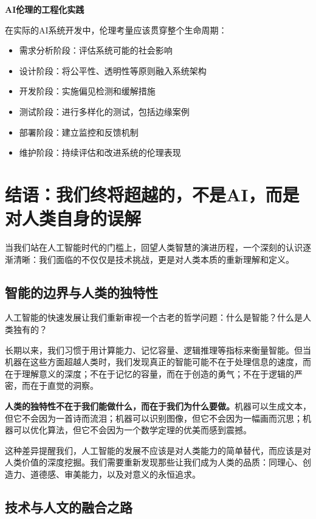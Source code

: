 \begin{methodbox}
{\bf AI伦理的工程化实践}

在实际的AI系统开发中，伦理考量应该贯穿整个生命周期：
\begin{itemize}
\item 需求分析阶段：评估系统可能的社会影响
\item 设计阶段：将公平性、透明性等原则融入系统架构
\item 开发阶段：实施偏见检测和缓解措施
\item 测试阶段：进行多样化的测试，包括边缘案例
\item 部署阶段：建立监控和反馈机制
\item 维护阶段：持续评估和改进系统的伦理表现
\end{itemize}
\end{methodbox}

\section*{结语：我们终将超越的，不是AI，而是对人类自身的误解}

当我们站在人工智能时代的门槛上，回望人类智慧的演进历程，一个深刻的认识逐渐清晰：我们面临的不仅仅是技术挑战，更是对人类本质的重新理解和定义。

\subsection*{智能的边界与人类的独特性}

人工智能的快速发展让我们重新审视一个古老的哲学问题：什么是智能？什么是人类独有的？

长期以来，我们习惯于用计算能力、记忆容量、逻辑推理等指标来衡量智能。但当机器在这些方面超越人类时，我们发现真正的智能可能不在于处理信息的速度，而在于理解意义的深度；不在于记忆的容量，而在于创造的勇气；不在于逻辑的严密，而在于直觉的洞察。

{\bf 人类的独特性不在于我们能做什么，而在于我们为什么要做。}机器可以生成文本，但它不会因为一首诗而流泪；机器可以识别图像，但它不会因为一幅画而沉思；机器可以优化算法，但它不会因为一个数学定理的优美而感到震撼。

这种差异提醒我们，人工智能的发展不应该是对人类能力的简单替代，而应该是对人类价值的深度挖掘。我们需要重新发现那些让我们成为人类的品质：同理心、创造力、道德感、审美能力，以及对意义的永恒追求。

\subsection*{技术与人文的融合之路}

